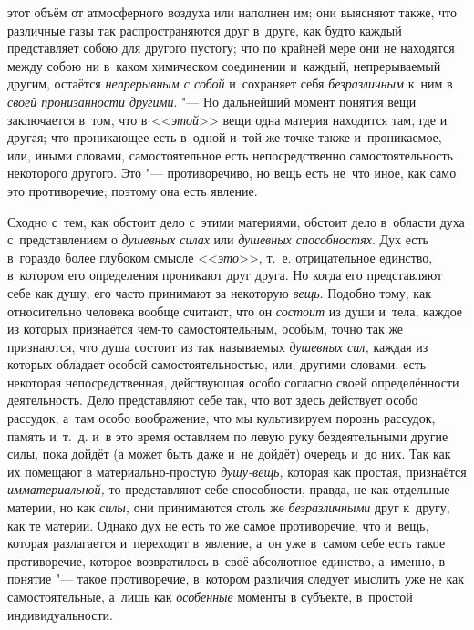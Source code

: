 этот объём от атмосферного воздуха или наполнен им; они выясняют также, что
различные газы так распространяются друг в~друге, как будто каждый
представляет собою для другого пустоту; что по крайней мере они не
находятся между собою ни в~каком химическом соединении и~каждый,
непрерываемый другим, остаётся {\em непрерывным с
собой} и~сохраняет себя {\em безразличным} к~ним в
{\em своей пронизанности другими}. "--- Но дальнейший
момент понятия вещи заключается в~том, что в
<<{\em этой}>> вещи одна материя находится там, где и
другая; что проникающее есть в~одной и~той же точке также и~проникаемое,
или, иными словами, самостоятельное есть непосредственно самостоятельность
некоторого другого. Это "--- противоречиво, но вещь есть не~что иное, как само
это противоречие; поэтому она есть явление.

Сходно с~тем, как обстоит дело с~этими материями, обстоит дело в~области
духа с~представлением о {\em душевных силах} или
{\em душевных способностях}. Дух есть в~гораздо более
глубоком смысле <<{\em это}>>, т.~е. отрицательное
единство, в~котором его определения проникают друг друга. Но когда его
представляют себе как душу, его часто принимают за некоторую
{\em вещь}. Подобно тому, как относительно человека
вообще считают, что он {\em состоит} из души и~тела,
каждое из которых признаётся чем-то самостоятельным, особым, точно так же
признаются, что душа состоит из так называемых
{\em душевных сил,} каждая из которых обладает особой
самостоятельностью, или, другими словами, есть некоторая непосредственная,
действующая особо согласно своей определённости деятельность. Дело
представляют себе так, что вот здесь действует особо рассудок, а~там особо
воображение, что мы культивируем порознь рассудок, память и~т.~д. и~в это
время оставляем по левую руку бездеятельными другие силы, пока дойдёт (а
может быть даже и~не дойдёт) очередь и~до них. Так как их помещают в
материально-простую {\em душу-вещь,} которая как
простая, признаётся {\em имматериальной,} то
представляют себе способности, правда, не как отдельные материи, но как
{\em силы,} они принимаются столь же
{\em безразличными} друг к~другу, как те материи.
Однако дух не есть то же самое противоречие, что и~вещь, которая
разлагается и~переходит в~явление, а~он уже в~самом себе есть такое
противоречие, которое возвратилось в~своё абсолютное единство, а~именно, в
понятие "--- такое противоречие, в~котором различия следует мыслить уже не как
самостоятельные, а~лишь как {\em особенные} моменты в
субъекте, в~простой индивидуальности.
